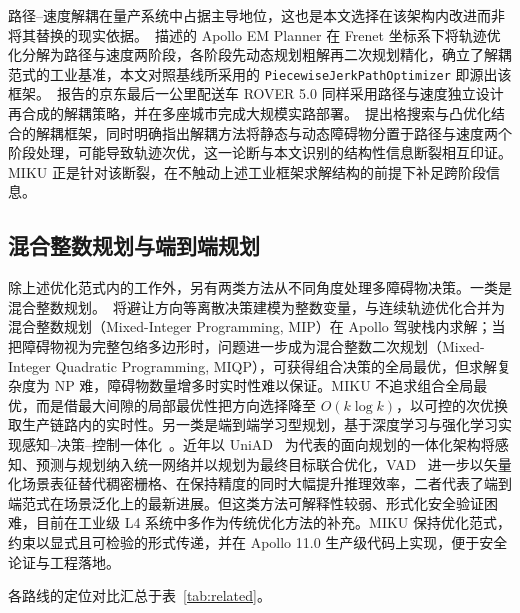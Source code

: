 \documentclass[a4paper,11pt]{ctexart}
\theoremstyle{definition}
\begin{document}
路径--速度解耦在量产系统中占据主导地位，这也是本文选择在该架构内改进而非将其替换的现实依据。\citet{fan2018baidu}~描述的 Apollo EM Planner 在 Frenet 坐标系下将轨迹优化分解为路径与速度两阶段，各阶段先动态规划粗解再二次规划精化，确立了解耦范式的工业基准，本文对照基线所采用的 \texttt{PiecewiseJerkPathOptimizer} 即源出该框架。\citet{wang2022_jfr}~报告的京东最后一公里配送车 ROVER 5.0 同样采用路径与速度独立设计再合成的解耦策略，并在多座城市完成大规模实路部署。\citet{meng2019_access}~提出格搜索与凸优化结合的解耦框架，同时明确指出解耦方法将静态与动态障碍物分置于路径与速度两个阶段处理，可能导致轨迹次优，这一论断与本文识别的结构性信息断裂相互印证。MIKU 正是针对该断裂，在不触动上述工业框架求解结构的前提下补足跨阶段信息。

\subsection{混合整数规划与端到端规划}
\label{sec:related-supplement}

除上述优化范式内的工作外，另有两类方法从不同角度处理多障碍物决策。一类是混合整数规划。\citet{kessler2023}~将避让方向等离散决策建模为整数变量，与连续轨迹优化合并为混合整数规划（Mixed-Integer Programming, MIP）在 Apollo 驾驶栈内求解；当把障碍物视为完整包络多边形时，问题进一步成为混合整数二次规划（Mixed-Integer Quadratic Programming, MIQP），可获得组合决策的全局最优，但求解复杂度为 NP 难，障碍物数量增多时实时性难以保证。MIKU 不追求组合全局最优，而是借最大间隙的局部最优性把方向选择降至 $O(k\log k)$，以可控的次优换取生产链路内的实时性。另一类是端到端学习型规划，基于深度学习与强化学习实现感知--决策--控制一体化~\citep{li2024decision,zhang2021autonomous}。近年以 UniAD~\citep{hu2023uniad} 为代表的面向规划的一体化架构将感知、预测与规划纳入统一网络并以规划为最终目标联合优化，VAD~\citep{jiang2023vad} 进一步以矢量化场景表征替代稠密栅格、在保持精度的同时大幅提升推理效率，二者代表了端到端范式在场景泛化上的最新进展。但这类方法可解释性较弱、形式化安全验证困难，目前在工业级 L4 系统中多作为传统优化方法的补充。MIKU 保持优化范式，约束以显式且可检验的形式传递，并在 Apollo 11.0 生产级代码上实现，便于安全论证与工程落地。

各路线的定位对比汇总于表~\ref{tab:related}。
\end{document}
